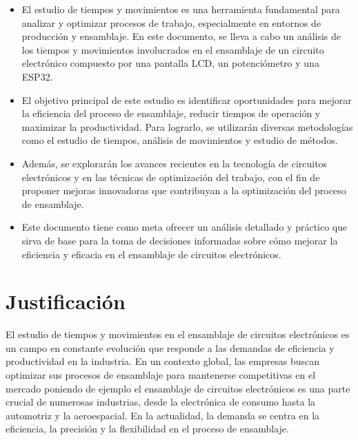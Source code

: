     \begin{itemize}
    
     \item El estudio de tiempos y movimientos es una herramienta fundamental para analizar y optimizar procesos de trabajo, especialmente en entornos de producción y ensamblaje. En este documento, se lleva a cabo un análisis de los tiempos y movimientos involucrados en el ensamblaje de un circuito electrónico compuesto por una pantalla LCD, un potenciómetro y una ESP32.\cite{lópez_2020}
    
     \item El objetivo principal de este estudio es identificar oportunidades para mejorar la eficiencia del proceso de ensamblaje, reducir tiempos de operación y maximizar la productividad. Para lograrlo, se utilizarán diversas metodologías como el estudio de tiempos, análisis de movimientos y estudio de métodos.
    
     \item Además, se explorarán los avances recientes en la tecnología de circuitos electrónicos y en las técnicas de optimización del trabajo, con el fin de proponer mejoras innovadoras que contribuyan a la optimización del proceso de ensamblaje.
    
     \item Este documento tiene como meta ofrecer un análisis detallado y práctico que sirva de base para la toma de decisiones informadas sobre cómo mejorar la eficiencia y eficacia en el ensamblaje de circuitos electrónicos.
    
    
    \end{itemize}
    \section{Justificación}
    
    El estudio de tiempos y movimientos en el ensamblaje de circuitos electrónicos es un campo en constante evolución que responde a las demandas de eficiencia y productividad en la industria. En un contexto global, las empresas buscan optimizar sus procesos de ensamblaje para mantenerse competitivas en el mercado poniendo de ejemplo el ensamblaje de circuitos electrónicos es una parte crucial de numerosas industrias, desde la electrónica de consumo hasta la automotriz y la aeroespacial. En la actualidad, la demanda se centra en la eficiencia, la precisión y la flexibilidad en el proceso de ensamblaje.
    \cite{marcelo_fabián_2024}
    
